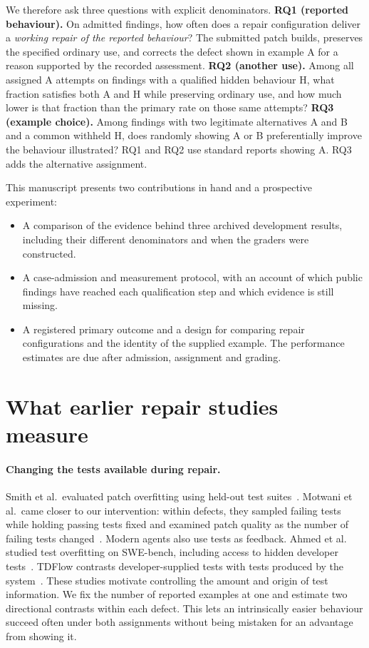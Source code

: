 We therefore ask three questions with explicit denominators. \textbf{RQ1 (reported behaviour).} On admitted findings, how often does a repair configuration deliver a \emph{working repair of the reported behaviour}? The submitted patch builds, preserves the specified ordinary use, and corrects the defect shown in example A for a reason supported by the recorded assessment. \textbf{RQ2 (another use).} Among all assigned A attempts on findings with a qualified hidden behaviour H, what fraction satisfies both A and H while preserving ordinary use, and how much lower is that fraction than the primary rate on those same attempts? \textbf{RQ3 (example choice).} Among findings with two legitimate alternatives A and B and a common withheld H, does randomly showing A or B preferentially improve the behaviour illustrated? RQ1 and RQ2 use standard reports showing A. RQ3 adds the alternative assignment.

This manuscript presents two contributions in hand and a prospective experiment:
\begin{itemize}
\item A comparison of the evidence behind three archived development results, including their different denominators and when the graders were constructed.
\item A case-admission and measurement protocol, with an account of which public findings have reached each qualification step and which evidence is still missing.
\item A registered primary outcome and a design for comparing repair configurations and the identity of the supplied example. The performance estimates are due after admission, assignment and grading.
\end{itemize}

\section{What earlier repair studies measure}
\paragraph{Changing the tests available during repair.}
Smith et al.\ evaluated patch overfitting using held-out test suites~\cite{smith2015overfitting}. Motwani et al.\ came closer to our intervention: within defects, they sampled failing tests while holding passing tests fixed and examined patch quality as the number of failing tests changed~\cite{motwani2022quality}. Modern agents also use tests as feedback. Ahmed et al. studied test overfitting on SWE-bench, including access to hidden developer tests~\cite{ahmed2026overfitting}. TDFlow contrasts developer-supplied tests with tests produced by the system~\cite{han2026tdflow}. These studies motivate controlling the amount and origin of test information. We fix the number of reported examples at one and estimate two directional contrasts within each defect. This lets an intrinsically easier behaviour succeed often under both assignments without being mistaken for an advantage from showing it.

